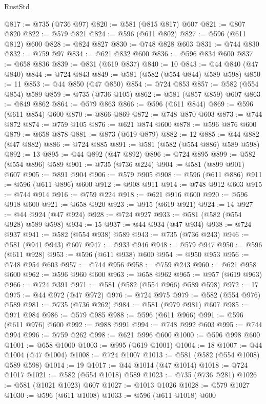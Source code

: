 \begin{lexlean}{RustStd}
\begin{coremodule}
@817 := @735 (@736 @97)
@820 := @581 (@815 @817) @607
@821 := @807 @820
@822 := @579 @821
@824 := @596 (@611 @802)
@827 := @596 (@611 @812) @600
@828 := @824 @827
@830 := @748 @828 @603
@831 := @744 @830
@832 := @759 @97
@834 := @621 @832 @600
@836 := @596 @834 @600
@837 := @658 @836
@839 := @831 (@619 @837)
@840 := 10
@843 := @44 @840 (@47 @840)
@844 := @724 @843
@849 := @581 (@582 (@554 @844) @589 @598)
@850 := 11
@853 := @44 @850 (@47 @850)
@854 := @724 @853
@857 := @582 (@554 @854) @589
@859 := @735 (@736 @105)
@862 := @581 (@857 @859) @607
@863 := @849 @862
@864 := @579 @863
@866 := @596 (@611 @844)
@869 := @596 (@611 @854) @600
@870 := @866 @869
@872 := @748 @870 @603
@873 := @744 @872
@874 := @759 @105
@876 := @621 @874 @600
@878 := @596 @876 @600
@879 := @658 @878
@881 := @873 (@619 @879)
@882 := 12
@885 := @44 @882 (@47 @882)
@886 := @724 @885
@891 := @581 (@582 (@554 @886) @589 @598)
@892 := 13
@895 := @44 @892 (@47 @892)
@896 := @724 @895
@899 := @582 (@554 @896) @589
@901 := @735 (@736 @224)
@904 := @581 (@899 @901) @607
@905 := @891 @904
@906 := @579 @905
@908 := @596 (@611 @886)
@911 := @596 (@611 @896) @600
@912 := @908 @911
@914 := @748 @912 @603
@915 := @744 @914
@916 := @759 @224
@918 := @621 @916 @600
@920 := @596 @918 @600
@921 := @658 @920
@923 := @915 (@619 @921)
@924 := 14
@927 := @44 @924 (@47 @924)
@928 := @724 @927
@933 := @581 (@582 (@554 @928) @589 @598)
@934 := 15
@937 := @44 @934 (@47 @934)
@938 := @724 @937
@941 := @582 (@554 @938) @589
@943 := @735 (@736 @243)
@946 := @581 (@941 @943) @607
@947 := @933 @946
@948 := @579 @947
@950 := @596 (@611 @928)
@953 := @596 (@611 @938) @600
@954 := @950 @953
@956 := @748 @954 @603
@957 := @744 @956
@958 := @759 @243
@960 := @621 @958 @600
@962 := @596 @960 @600
@963 := @658 @962
@965 := @957 (@619 @963)
@966 := @724 @391
@971 := @581 (@582 (@554 @966) @589 @598)
@972 := 17
@975 := @44 @972 (@47 @972)
@976 := @724 @975
@979 := @582 (@554 @976) @589
@981 := @735 (@736 @262)
@984 := @581 (@979 @981) @607
@985 := @971 @984
@986 := @579 @985
@988 := @596 (@611 @966)
@991 := @596 (@611 @976) @600
@992 := @988 @991
@994 := @748 @992 @603
@995 := @744 @994
@996 := @759 @262
@998 := @621 @996 @600
@1000 := @596 @998 @600
@1001 := @658 @1000
@1003 := @995 (@619 @1001)
@1004 := 18
@1007 := @44 @1004 (@47 @1004)
@1008 := @724 @1007
@1013 := @581 (@582 (@554 @1008) @589 @598)
@1014 := 19
@1017 := @44 @1014 (@47 @1014)
@1018 := @724 @1017
@1021 := @582 (@554 @1018) @589
@1023 := @735 (@736 @281)
@1026 := @581 (@1021 @1023) @607
@1027 := @1013 @1026
@1028 := @579 @1027
@1030 := @596 (@611 @1008)
@1033 := @596 (@611 @1018) @600

\end{coremodule}
\end{lexlean}
